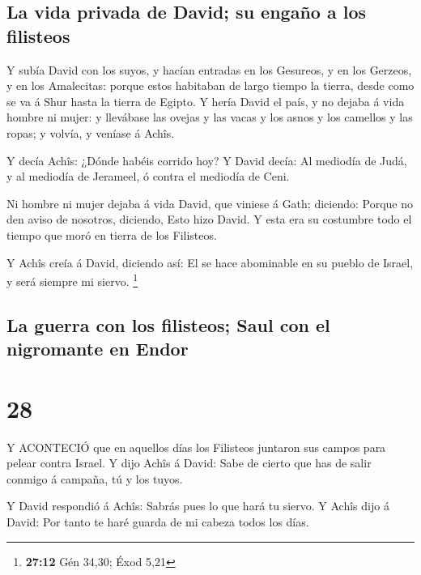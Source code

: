 \hypertarget{la-vida-privada-de-david-su-engauxf1o-a-los-filisteos}{%
\subsection{La vida privada de David; su engaño a los
filisteos}\label{la-vida-privada-de-david-su-engauxf1o-a-los-filisteos}}

 Y subía David con los suyos, y hacían entradas en los
Gesureos, y en los Gerzeos, y en los Amalecitas: porque estos habitaban
de largo tiempo la tierra, desde como se va á Shur hasta la tierra de
Egipto.  Y hería David el país, y no dejaba á vida hombre ni
mujer: y llevábase las ovejas y las vacas y los asnos y los camellos y
las ropas; y volvía, y veníase á Achîs.

 Y decía Achîs: ¿Dónde habéis corrido hoy? Y David decía:
Al mediodía de Judá, y al mediodía de Jerameel, ó contra el mediodía de
Ceni.

 Ni hombre ni mujer dejaba á vida David, que viniese á
Gath; diciendo: Porque no den aviso de nosotros, diciendo, Esto hizo
David. Y esta era su costumbre todo el tiempo que moró en tierra de los
Filisteos.

 Y Achîs creía á David, diciendo así: El se hace abominable
en su pueblo de Israel, y será siempre mi siervo. \footnote{\textbf{27:12}
  Gén 34,30; Éxod 5,21}

\hypertarget{la-guerra-con-los-filisteos-saul-con-el-nigromante-en-endor}{%
\subsection{La guerra con los filisteos; Saul con el nigromante en
Endor}\label{la-guerra-con-los-filisteos-saul-con-el-nigromante-en-endor}}

\hypertarget{section-27}{%
\section{28}\label{section-27}}

 Y ACONTECIÓ que en aquellos días los Filisteos juntaron sus
campos para pelear contra Israel. Y dijo Achîs á David: Sabe de cierto
que has de salir conmigo á campaña, tú y los tuyos.

 Y David respondió á Achîs: Sabrás pues lo que hará tu
siervo. Y Achîs dijo á David: Por tanto te haré guarda de mi cabeza
todos los días.

